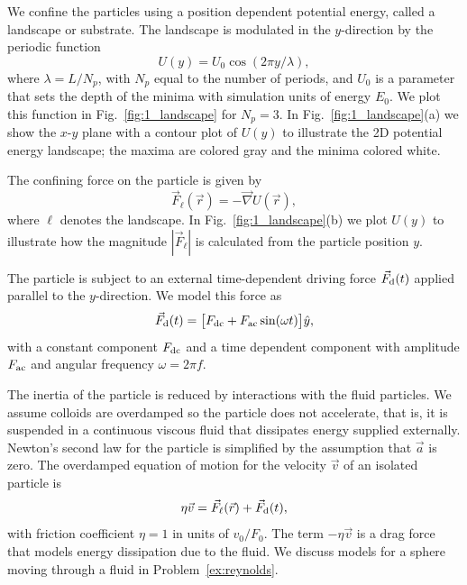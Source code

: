 \documentclass[preprint,showpacs,preprintnumbers,amsmath,amssymb,aps,prb]{revtex4-1}
\theoremstyle{remark}
\begin{document}
We confine the particles using a position dependent 
potential energy, called a landscape or substrate.
The landscape is modulated in the $y$-direction
by the periodic function 
 \begin{equation}
   U(y) = U_0 \cos{(2 \pi y / \lambda)},
     \label{eq:ysubstrate}
\end{equation}
where $\lambda=L/N_p$, with $N_p$ equal to the number of periods,
and $U_0$ is a parameter
 that sets the depth of the minima
 with simulation units of energy $E_0$. 
 We plot this function in 
 Fig.~\ref{fig:1_landscape}
 for $N_p = 3$.  In Fig.~\ref{fig:1_landscape}(a) we show 
 the $x$-$y$ plane with a contour plot of $U(y)$ 
 to illustrate
 the 2D potential energy landscape;
 the maxima are colored gray and the minima colored white.

The confining force on the particle %
 is given by
 \begin{equation}
 \vec{F}_{\ell}(\vec{r}) = - \vec \nabla U(\vec{r}),
 \label{eq:dudr}
 \end{equation}
where $\ell$ denotes the landscape.
 In Fig.~\ref{fig:1_landscape}(b) we plot  
 $U(y)$ to illustrate how the magnitude
 $|\vec{F}_{\ell}|$ is calculated from the particle position $y$.
 
The particle is subject to an external time-dependent driving force
$\vec{F}_{\rm d}(t)$
applied parallel to the $y$-direction.
We model this force as
\begin{equation}
  \vec{F}_{\rm d}(t) = \big [F_{\rm dc} + F_{\rm ac} \sin(\omega t)\big] \hat{y},
    \label{eq:drive}
\end{equation}
with 
a constant component $F_{\rm dc}$
and a time dependent component with amplitude $F_{\rm ac}$
and angular frequency $\omega = 2 \pi f$.

The inertia of the 
particle is reduced by interactions
with the fluid particles.\cite{Purcell1977}
We assume 
colloids are
overdamped
so the particle does not accelerate,
that is, it is suspended in a continuous viscous fluid
that dissipates energy supplied externally. 
Newton's second law for the particle
is simplified
by the assumption that $\vec{a}$ is zero. 
The overdamped equation of motion for
the velocity $\vec{v}$ of 
an isolated particle is
\begin{equation}
  \eta \vec{v} = \vec{F}_{\ell}(\vec{r}) + \vec{F}_{\rm d}(t),
    \label{eq:motion}
\end{equation}
with friction coefficient $\eta = 1$ in units of $v_0 / F_0$.
The term $-\eta \vec{v}$
is a drag force that models
energy dissipation due to the fluid. 
We discuss  models for
a sphere moving through a fluid in 
Problem~\ref{ex:reynolds}. 
\end{document}
